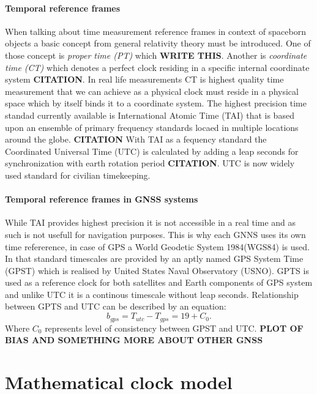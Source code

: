 \paragraph{Temporal reference frames}
When talking about time measurement reference frames in context of spaceborn objects a basic
concept from general relativity theory must be introduced.
One of those concept is \emph{proper time (PT)} which \textbf{WRITE THIS}.
Another is \emph{coordinate time (CT)} which denotes a perfect clock residing in a specific 
internal coordinate system \textbf{CITATION}.
In real life measurements CT is highest quality time measurement that we can achieve as a 
physical clock must reside in a physical space which by itself binds it to a coordinate system.
The highest precision time standad currently available is International Atomic Time (TAI)
that is based upon an ensemble of primary frequency standards locaed in multiple locations
around the globe. \textbf{CITATION} With TAI as a fequency standard the Coordinated Universal
Time (UTC) is calculated by adding a leap seconds for synchronization with earth rotation
period \textbf{CITATION}. UTC is now widely used standard for civilian timekeeping.

\paragraph{Temporal reference frames in GNSS systems}
While TAI provides highest precision it is not accessible in a real time and as such is 
not usefull for navigation purposes.
This is why each GNNS uses its own time refererence, in case of GPS a World Geodetic System
1984(WGS84) is used. In that standard timescales are provided by an aptly named GPS System Time
(GPST) which is realised by United States Naval Observatory (USNO). 
GPTS is used as a reference clock for both satellites and Earth components of GPS system and 
unlike UTC it is a continous timescale without leap seconds.
Relationship between GPTS and UTC can be described by an equation:
\begin{equation}
	b_{gps} = T_{utc} - T_{gps} = 19 + C_{0}.
\end{equation}
Where $C_{0}$ represents level of consistency between GPST and UTC.
\textbf{PLOT OF BIAS AND SOMETHING MORE ABOUT OTHER GNSS}
\section{Mathematical clock model}

